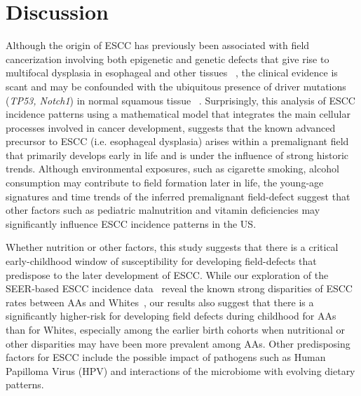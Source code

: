 \documentclass[10pt,letterpaper]{article}
\begin{document}
\section*{Discussion}

Although the origin of ESCC has previously been associated with field cancerization involving both epigenetic and genetic defects that give rise to multifocal dysplasia in esophageal and other tissues ~\cite{Slaughter1953,  Ohashi2015}, the clinical evidence is scant and may be confounded with the ubiquitous presence of driver mutations ({\it TP53, Notch1}) in normal squamous tissue ~\cite{Martincorena2018}. Surprisingly, this analysis of ESCC incidence patterns using a mathematical model that integrates the main cellular processes involved in cancer development, suggests that the known advanced precursor to ESCC (i.e. esophageal dysplasia) arises within a premalignant field that primarily develops early in life and is under the influence of strong historic trends. Although environmental exposures, such as cigarette smoking, alcohol consumption may contribute to field formation later in life, the young-age signatures and time trends of the inferred premalignant field-defect suggest that other factors such as pediatric malnutrition and vitamin deficiencies may significantly influence ESCC incidence patterns in the US.

Whether nutrition or other factors, this study suggests that there is a critical early-childhood window of susceptibility for developing field-defects that predispose to the later development of ESCC. While our exploration of the SEER-based ESCC incidence data~\cite{SEER2019} reveal the known strong disparities of ESCC rates between AAs and Whites~\cite{Brown2001}, our results also suggest that there is a significantly higher-risk for developing field defects during childhood for AAs than for Whites, especially among the earlier birth cohorts when nutritional or other disparities may have been more prevalent among AAs. Other predisposing factors for ESCC include the possible impact of pathogens such as Human Papilloma Virus (HPV) \cite{Dinc2020} and interactions of the microbiome with evolving dietary patterns. 
\end{document}
